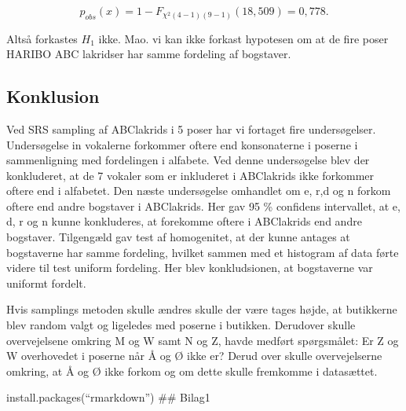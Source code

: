 \documentclass[]{article}
\begin{document}
\begin{equation*}
p_{obs}(x)=1-F_{\chi^2(4-1)(9-1)}(18,509)=0,778.
\end{equation*}

Altså forkastes \(H_1\) ikke. Mao. vi kan ikke forkast hypotesen om at
de fire poser HARIBO ABC lakridser har samme fordeling af bogstaver.

\subsection{Konklusion}\label{konklusion}

Ved SRS sampling af ABClakrids i 5 poser har vi fortaget fire
undersøgelser. Undersøgelse in vokalerne forkommer oftere end
konsonaterne i poserne i sammenligning med fordelingen i alfabete. Ved
denne undersøgelse blev der konkluderet, at de 7 vokaler som er
inkluderet i ABClakrids ikke forkommer oftere end i alfabetet. Den næste
undersøgelse omhandlet om e, r,d og n forkom oftere end andre bogstaver
i ABClakrids. Her gav 95 \% confidens intervallet, at e, d, r og n kunne
konkluderes, at forekomme oftere i ABClakrids end andre bogstaver.
Tilgengæld gav test af homogenitet, at der kunne antages at bogstaverne
har samme fordeling, hvilket sammen med et histogram af data førte
videre til test uniform fordeling. Her blev konkludsionen, at
bogstaverne var uniformt fordelt.

Hvis samplings metoden skulle ændres skulle der være tages højde, at
butikkerne blev random valgt og ligeledes med poserne i butikken.
Derudover skulle overvejelsene omkring M og W samt N og Z, havde medført
spørgsmålet: Er Z og W overhovedet i poserne når Å og Ø ikke er? Derud
over skulle overvejelserne omkring, at Å og Ø ikke forkom og om dette
skulle fremkomme i datasættet.

install.packages(``rmarkdown'') \#\# Bilag1
\end{document}
